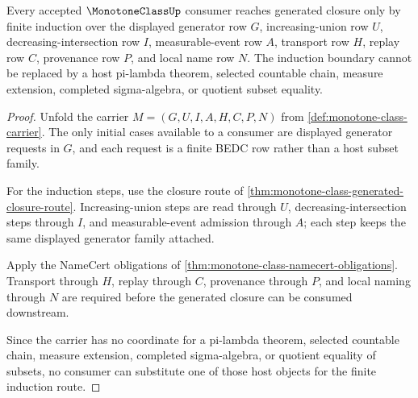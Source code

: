 \begin{theorem}
\label{thm:monotone-class-generator-induction-boundary}
Every accepted $\MonotoneClassUp$ consumer reaches generated closure only by finite induction over the displayed generator row $G$, increasing-union row $U$, decreasing-intersection row $I$, measurable-event row $A$, transport row $H$, replay row $C$, provenance row $P$, and local name row $N$. The induction boundary cannot be replaced by a host pi-lambda theorem, selected countable chain, measure extension, completed sigma-algebra, or quotient subset equality.
\end{theorem}
\begin{proof}
Unfold the carrier $M=(G,U,I,A,H,C,P,N)$ from \autoref{def:monotone-class-carrier}. The only initial cases available to a consumer are displayed generator requests in $G$, and each request is a finite BEDC row rather than a host subset family.

For the induction steps, use the closure route of \autoref{thm:monotone-class-generated-closure-route}. Increasing-union steps are read through $U$, decreasing-intersection steps through $I$, and measurable-event admission through $A$; each step keeps the same displayed generator family attached.

Apply the NameCert obligations of \autoref{thm:monotone-class-namecert-obligations}. Transport through $H$, replay through $C$, provenance through $P$, and local naming through $N$ are required before the generated closure can be consumed downstream.

Since the carrier has no coordinate for a pi-lambda theorem, selected countable chain, measure extension, completed sigma-algebra, or quotient equality of subsets, no consumer can substitute one of those host objects for the finite induction route.
\end{proof}

\begin{closurestatus}{\MonotoneClassUp}
  \theoryclosure{\seedClosure}
  \formalstatus{\unformalizedV}
\end{closurestatus}
